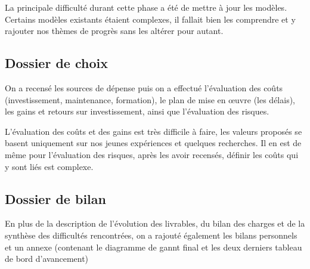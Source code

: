        La principale difficulté durant cette phase a été de mettre à jour les modèles. Certains modèles existants étaient complexes, il fallait bien les comprendre et y rajouter nos thèmes de progrès sans les altérer pour autant.

       \subsection{Dossier de choix}
On a recensé les sources de dépense puis on a effectué l'évaluation des coûts (investissement, maintenance, formation), le plan de mise en œuvre (les délais), les gains et retours sur investissement, ainsi que l'évaluation des risques.

        L'évaluation des coûts et des gains est très difficile à faire, les valeurs proposés se basent uniquement sur nos jeunes expériences et quelques recherches. Il en est de même pour l'évaluation des risques, après les avoir recensés, définir les coûts qui y sont liés est complexe.

       \subsection{Dossier de bilan}
En plus de la description de l'évolution des livrables, du bilan des charges et de la synthèse des difficultés rencontrées, on a rajouté également les bilans personnels et un annexe (contenant le diagramme de gannt final et les deux derniers tableau de bord d'avancement)


